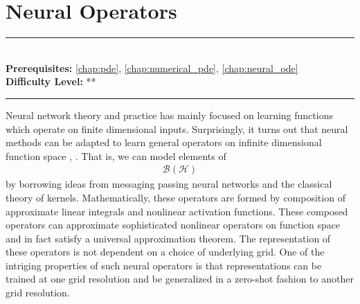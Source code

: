 \documentclass[book.tex]{subfiles}
\begin{document}
\chapter{Neural Operators}
\label{chap:neural_operators}
\noindent\rule{11cm}{0.4pt} \\
\textbf{Prerequisites:}  \autoref{chap:pde}, \autoref{chap:numerical_pde}, \autoref{chap:neural_ode}  \\
\textbf{Difficulty Level:} ** \\
\noindent\rule{11cm}{0.4pt}
\vspace{5mm}


Neural network theory and practice has mainly focused on learning functions which operate on finite dimensional inputs. Surprisingly, it turns out that neural methods can be adapted to learn general operators on infinite dimensional function space \cite{li2020fourier}, \cite{li2020neural}. That is, we can model elements of
\begin{align}
    \mathcal{B}(\mathcal{H})
\end{align}
by borrowing ideas from messaging passing neural networks and the classical theory of kernels. Mathematically, these operators are formed by composition of approximate linear integrals and nonlinear activation functions. These composed operators can approximate sophisticated nonlinear operators on function space and in fact satisfy a universal approximation theorem. The representation of these operators is not dependent on a choice of underlying grid. One of the intriging properties of such neural operators is that representations can be trained at one grid resolution and be generalized in a zero-shot fashion to another grid resolution.
\end{document}
